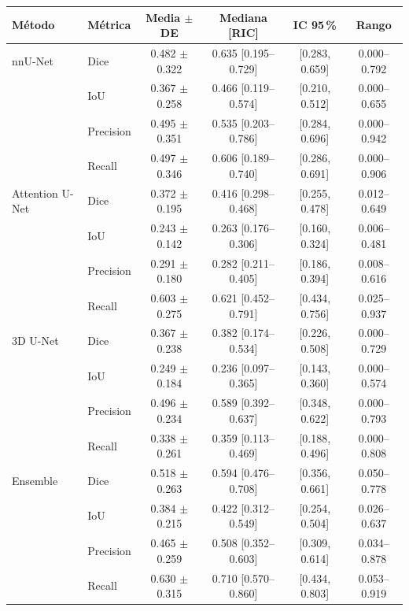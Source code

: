 \small
\begin{tabular}{llcccc}
\toprule
Método & Métrica & Media $\pm$ DE & Mediana [RIC] & IC 95\,\% & Rango \\
\midrule
nnU-Net & Dice & 0.482 $\pm$ 0.322 & 0.635 [0.195--0.729] & [0.283, 0.659] & 0.000--0.792 \\
 & IoU & 0.367 $\pm$ 0.258 & 0.466 [0.119--0.574] & [0.210, 0.512] & 0.000--0.655 \\
 & Precision & 0.495 $\pm$ 0.351 & 0.535 [0.203--0.786] & [0.284, 0.696] & 0.000--0.942 \\
 & Recall & 0.497 $\pm$ 0.346 & 0.606 [0.189--0.740] & [0.286, 0.691] & 0.000--0.906 \\
\addlinespace
Attention U-Net & Dice & 0.372 $\pm$ 0.195 & 0.416 [0.298--0.468] & [0.255, 0.478] & 0.012--0.649 \\
 & IoU & 0.243 $\pm$ 0.142 & 0.263 [0.176--0.306] & [0.160, 0.324] & 0.006--0.481 \\
 & Precision & 0.291 $\pm$ 0.180 & 0.282 [0.211--0.405] & [0.186, 0.394] & 0.008--0.616 \\
 & Recall & 0.603 $\pm$ 0.275 & 0.621 [0.452--0.791] & [0.434, 0.756] & 0.025--0.937 \\
\addlinespace
3D U-Net & Dice & 0.367 $\pm$ 0.238 & 0.382 [0.174--0.534] & [0.226, 0.508] & 0.000--0.729 \\
 & IoU & 0.249 $\pm$ 0.184 & 0.236 [0.097--0.365] & [0.143, 0.360] & 0.000--0.574 \\
 & Precision & 0.496 $\pm$ 0.234 & 0.589 [0.392--0.637] & [0.348, 0.622] & 0.000--0.793 \\
 & Recall & 0.338 $\pm$ 0.261 & 0.359 [0.113--0.469] & [0.188, 0.496] & 0.000--0.808 \\
\addlinespace
Ensemble & Dice & 0.518 $\pm$ 0.263 & 0.594 [0.476--0.708] & [0.356, 0.661] & 0.050--0.778 \\
 & IoU & 0.384 $\pm$ 0.215 & 0.422 [0.312--0.549] & [0.254, 0.504] & 0.026--0.637 \\
 & Precision & 0.465 $\pm$ 0.259 & 0.508 [0.352--0.603] & [0.309, 0.614] & 0.034--0.878 \\
 & Recall & 0.630 $\pm$ 0.315 & 0.710 [0.570--0.860] & [0.434, 0.803] & 0.053--0.919 \\
\bottomrule
\end{tabular}%
